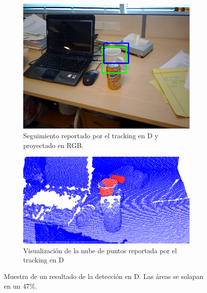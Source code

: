 \begin{figure}
	\centering
	\begin{subfigure}[b]{\textwidth}
		\includegraphics[width=\textwidth]{img/frame_98_taza_rgb.png}
		\caption{Seguimiento reportado por el tracking en D y proyectado en RGB.}
		\label{taza_ocluida_rgb}
	\end{subfigure}
	\quad
	\begin{subfigure}[b]{\textwidth}
		\includegraphics[width=\textwidth]{img/frame_98_taza_pcd.png}
		\caption{Visualización de la nube de puntos reportada por el tracking en D}
		\label{taza_ocluida_pcd}
	\end{subfigure}	
	\caption{Muestra de un resultado de la detección en D. Las áreas se solapan en un 47\%.}
	\label{taza_ocluida}
\end{figure}

